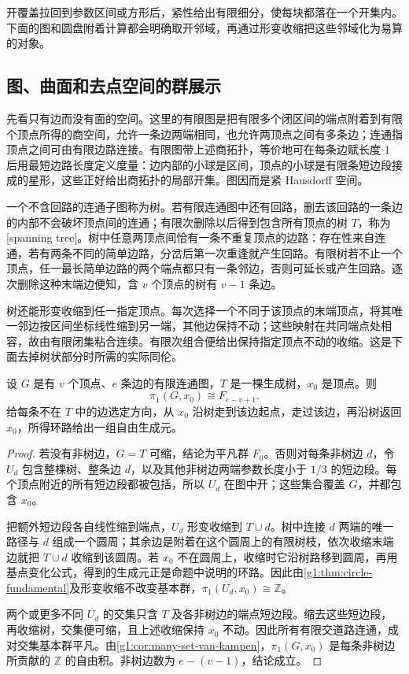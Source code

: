 开覆盖拉回到参数区间或方形后，紧性给出有限细分，使每块都落在一个开集内。下面的图和圆盘附着计算都会明确取开邻域，再通过形变收缩把这些邻域化为易算的对象。

\subsection{图、曲面和去点空间的群展示}
\label{g1:subsec:0502:04}

先看只有边而没有面的空间。这里的有限图是把有限多个闭区间的端点附着到有限个顶点所得的商空间，允许一条边两端相同，也允许两顶点之间有多条边；连通指顶点之间可由有限边路连接。有限图带上述商拓扑，等价地可在每条边赋长度 \(1\) 后用最短边路长度定义度量：边内部的小球是区间，顶点的小球是有限条短边段接成的星形，这些正好给出商拓扑的局部开集。图因而是紧 Hausdorff 空间。

一个不含回路的连通子图称为树。若有限连通图中还有回路，删去该回路的一条边的内部不会破坏顶点间的连通；有限次删除以后得到包含所有顶点的树 \(T\)，称为[spanning tree]。树中任意两顶点间恰有一条不重复顶点的边路：存在性来自连通，若有两条不同的简单边路，分岔后第一次重逢就产生回路。有限树若不止一个顶点，任一最长简单边路的两个端点都只有一条邻边，否则可延长或产生回路。逐次删除这种末端边便知，含 \(v\) 个顶点的树有 \(v-1\) 条边。

树还能形变收缩到任一指定顶点。每次选择一个不同于该顶点的末端顶点，将其唯一邻边按区间坐标线性缩到另一端，其他边保持不动；这些映射在共同端点处相容，故由有限闭集粘合连续。有限次组合便给出保持指定顶点不动的收缩。这是下面去掉树状部分时所需的实际同伦。

\begin{proposition}\label{g1:prop:graph-fundamental}
	设 \(G\) 是有 \(v\) 个顶点、\(e\) 条边的有限连通图，\(T\) 是一棵生成树，\(x_0\) 是顶点。则
	\[
		\pi_1(G,x_0)\cong F_{e-v+1}.
	\]
	给每条不在 \(T\) 中的边选定方向，从 \(x_0\) 沿树走到该边起点，走过该边，再沿树返回 \(x_0\)，所得环路给出一组自由生成元。
\end{proposition}
\begin{proof}
	若没有非树边，\(G=T\) 可缩，结论为平凡群 \(F_0\)。否则对每条非树边 \(d\)，令 \(U_d\) 包含整棵树、整条边 \(d\)，以及其他非树边两端参数长度小于 \(1/3\) 的短边段。每个顶点附近的所有短边段都被包括，所以 \(U_d\) 在图中开；这些集合覆盖 \(G\)，并都包含 \(x_0\)。

	把额外短边段各自线性缩到端点，\(U_d\) 形变收缩到 \(T\cup d\)。树中连接 \(d\) 两端的唯一路径与 \(d\) 组成一个圆周；其余边是附着在这个圆周上的有限树枝，依次收缩末端边就把 \(T\cup d\) 收缩到该圆周。若 \(x_0\) 不在圆周上，收缩时它沿树路移到圆周，再用基点变化公式，得到的生成元正是命题中说明的环路。因此由\cref{g1:thm:circle-fundamental}及形变收缩不改变基本群，\(\pi_1(U_d,x_0)\cong\mathbb Z\)。

	两个或更多不同 \(U_d\) 的交集只含 \(T\) 及各非树边的端点短边段。缩去这些短边段，再收缩树，交集便可缩，且上述收缩保持 \(x_0\) 不动。因此所有有限交道路连通，成对交集基本群平凡。由\cref{g1:cor:many-set-van-kampen}，\(\pi_1(G,x_0)\) 是每条非树边所贡献的 \(\mathbb Z\) 的自由积。非树边数为 \(e-(v-1)\)，结论成立。
\end{proof}

